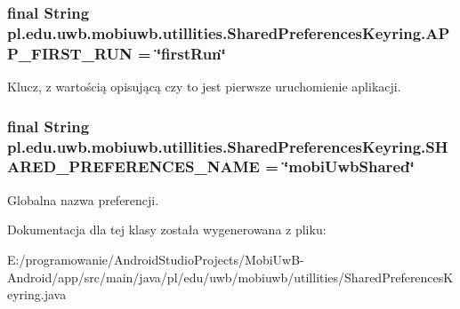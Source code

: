 \subsubsection[{A\+P\+P\+\_\+\+F\+I\+R\+S\+T\+\_\+\+R\+U\+N}]{\setlength{\rightskip}{0pt plus 5cm}final String pl.\+edu.\+uwb.\+mobiuwb.\+utillities.\+Shared\+Preferences\+Keyring.\+A\+P\+P\+\_\+\+F\+I\+R\+S\+T\+\_\+\+R\+U\+N = \char`\"{}first\+Run\char`\"{}\hspace{0.3cm}{\ttfamily [static]}}\label{classpl_1_1edu_1_1uwb_1_1mobiuwb_1_1utillities_1_1_shared_preferences_keyring_a183df76a7463b90cee1b06b40777dd32}
Klucz, z wartością opisującą czy to jest pierwsze uruchomienie aplikacji. \hypertarget{classpl_1_1edu_1_1uwb_1_1mobiuwb_1_1utillities_1_1_shared_preferences_keyring_a23d1c96090a7a001251efce7542ce097}{}
\subsubsection[{S\+H\+A\+R\+E\+D\+\_\+\+P\+R\+E\+F\+E\+R\+E\+N\+C\+E\+S\+\_\+\+N\+A\+M\+E}]{\setlength{\rightskip}{0pt plus 5cm}final String pl.\+edu.\+uwb.\+mobiuwb.\+utillities.\+Shared\+Preferences\+Keyring.\+S\+H\+A\+R\+E\+D\+\_\+\+P\+R\+E\+F\+E\+R\+E\+N\+C\+E\+S\+\_\+\+N\+A\+M\+E = \char`\"{}mobi\+Uwb\+Shared\char`\"{}\hspace{0.3cm}{\ttfamily [static]}}\label{classpl_1_1edu_1_1uwb_1_1mobiuwb_1_1utillities_1_1_shared_preferences_keyring_a23d1c96090a7a001251efce7542ce097}
Globalna nazwa preferencji. 

Dokumentacja dla tej klasy została wygenerowana z pliku\+:\begin{DoxyCompactItemize}
\item 
E\+:/programowanie/\+Android\+Studio\+Projects/\+Mobi\+Uw\+B-\/\+Android/app/src/main/java/pl/edu/uwb/mobiuwb/utillities/Shared\+Preferences\+Keyring.\+java\end{DoxyCompactItemize}

